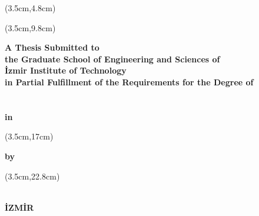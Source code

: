 \thispagestyle{empty}

\begin{center}
	\begin{textblock*}{\textwidth}(3.5cm,4.8cm)
		\textbf{\fontsize{18pt}{27pt}\selectfont\MakeUppercase\ThesisTitle}
	\end{textblock*}

	\begin{textblock*}{\textwidth}(3.5cm,9.8cm)
		\begin{spacing}{1}
			{\fontsize{14}{16}\bf
				A Thesis Submitted to\\
				the Graduate School of Engineering and Sciences of\\
				İzmir Institute of Technology\\
				in Partial Fulfillment of the Requirements for the Degree of\\
				~\\
				~\\
				in \DepartmentName
			}
		\end{spacing}
	\end{textblock*}

	\begin{textblock*}{\textwidth}(3.5cm,17cm)
		\begin{spacing}{1}
			{\fontsize{14}{16}\bf
				by\\
				\AuthorName{ }\MakeUppercase\AuthorSurname
			}
		\end{spacing}
	\end{textblock*}

	\begin{textblock*}{\textwidth}(3.5cm,22.8cm)
		\begin{spacing}{1}
			{\fontsize{14}{16}\bf
			\DefenceMonth{ }\DefenceYear\\
				İZMİR
			}
		\end{spacing}
	\end{textblock*}
\end{center}

~\pagebreak
